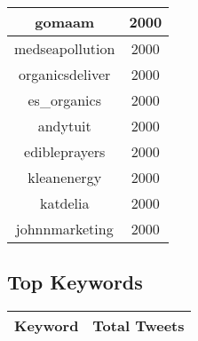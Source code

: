 \documentclass{article}\usepackage[T1]{fontenc}
\begin{document}
\begin{tabular}{|c|c|}
 \hline
gomaam & 2000\\ 
 \hline
medseapollution & 2000\\ 
 \hline
organicsdeliver & 2000\\ 
 \hline
es\_organics & 2000\\ 
 \hline
andytuit & 2000\\ 
 \hline
edibleprayers & 2000\\ 
 \hline
kleanenergy & 2000\\ 
 \hline
katdelia & 2000\\ 
 \hline
johnnmarketing & 2000\\ 
 \hline
\end{tabular}\subsection*{Top Keywords}\begin{tabular}{|c|c|}         \hline         Keyword & Total Tweets \\ 
 \hline
\end{tabular}
\end{document}
